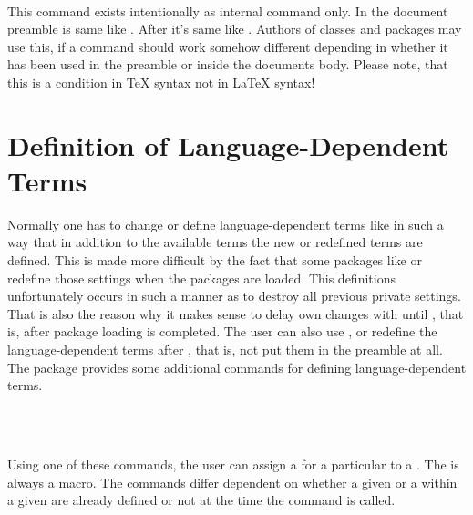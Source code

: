\begin{Declaration}
  \  
  \  
\end{Declaration}
%
This command exists intentionally as internal command only. In the document
preamble  is same like . After
 it's same like . Authors of
classes and packages may use this, if a command should work somehow different
depending in whether it has been used in the preamble or inside the documents
body. Please note, that this is a condition in \TeX{}
syntax not in \LaTeX{} syntax!
%
%


\section{Definition of Language-Dependent Terms}
\label{sec:scrbase.languageSupport}

Normally one has to change or define language-dependent terms like
 in such a way that in addition to the available terms
the new or redefined terms are defined. This is made more difficult by the
fact that some packages like  or
 redefine those settings when the
packages are loaded. This definitions unfortunately occurs in such a manner as
to destroy all previous private settings. That is also the reason why it makes
sense to delay own changes with  until
, that is, after package loading is
completed. The user can also use , or redefine the
language-dependent terms after , that is,
not put them in the preamble at all. The package 
provides some additional commands for defining language-dependent terms.


\begin{Declaration}
    \\
    \\
\end{Declaration}
%
%
%
Using one of these commands, the user can assign a  for a
particular  to a .  The  is always a
macro. The commands differ dependent on whether a given  or a
 within a given  are already defined or not at the
time the command is called.

